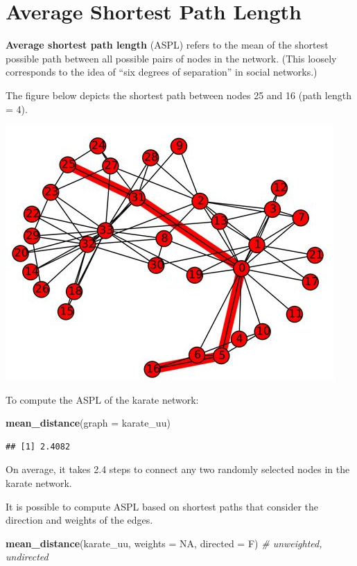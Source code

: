 \documentclass[
]{book}
\newenvironment{Shaded}{\begin{snugshade}}{\end{snugshade}}
\newcommand{\AttributeTok}[1]{\textcolor[rgb]{0.13,0.29,0.53}{#1}}
\newcommand{\CommentTok}[1]{\textcolor[rgb]{0.56,0.35,0.01}{\textit{#1}}}
\newcommand{\ConstantTok}[1]{\textcolor[rgb]{0.56,0.35,0.01}{#1}}
\newcommand{\FunctionTok}[1]{\textcolor[rgb]{0.13,0.29,0.53}{\textbf{#1}}}
\newcommand{\NormalTok}[1]{#1}
\begin{document}
\section{Average Shortest Path Length}\label{average-shortest-path-length}

\textbf{Average shortest path length} (ASPL) refers to the mean of the shortest possible path between all possible pairs of nodes in the network. (This loosely corresponds to the idea of ``six degrees of separation'' in social networks.)

The figure below depicts the shortest path between nodes 25 and 16 (path length = 4).

\includegraphics{images/shortest-path.jpeg}

To compute the ASPL of the karate network:

\begin{Shaded}
\begin{Highlighting}[]
\FunctionTok{mean\_distance}\NormalTok{(}\AttributeTok{graph =}\NormalTok{ karate\_uu)}
\end{Highlighting}
\end{Shaded}

\begin{verbatim}
## [1] 2.4082
\end{verbatim}

On average, it takes 2.4 steps to connect any two randomly selected nodes in the karate network.

It is possible to compute ASPL based on shortest paths that consider the direction and weights of the edges.

\begin{Shaded}
\begin{Highlighting}[]
\FunctionTok{mean\_distance}\NormalTok{(karate\_uu, }\AttributeTok{weights =} \ConstantTok{NA}\NormalTok{, }\AttributeTok{directed =}\NormalTok{ F) }\CommentTok{\# unweighted, undirected}
\end{Highlighting}
\end{Shaded}
\end{document}

